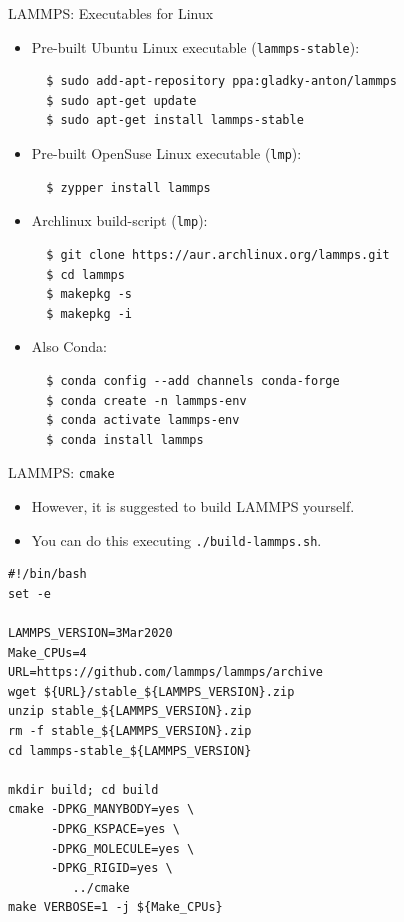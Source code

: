 \documentclass[10pt]{beamer}
\begin{document}
\begin{frame}[fragile]{LAMMPS: Executables for Linux}
  \begin{itemize}
    \item Pre-built Ubuntu Linux executable (\texttt{lammps-stable}):
    \begin{lstlisting}
  $ sudo add-apt-repository ppa:gladky-anton/lammps
  $ sudo apt-get update
  $ sudo apt-get install lammps-stable
    \end{lstlisting}

    \item Pre-built OpenSuse Linux executable (\texttt{lmp}):
    \begin{lstlisting}
  $ zypper install lammps
    \end{lstlisting}

    \item Archlinux build-script (\texttt{lmp}):
    \begin{lstlisting}
  $ git clone https://aur.archlinux.org/lammps.git
  $ cd lammps
  $ makepkg -s
  $ makepkg -i
    \end{lstlisting}

    \item Also Conda:
    \begin{lstlisting}
  $ conda config --add channels conda-forge
  $ conda create -n lammps-env
  $ conda activate lammps-env
  $ conda install lammps
    \end{lstlisting}
  \end{itemize}
\end{frame}

\begin{frame}[fragile]{LAMMPS: \texttt{cmake}}
  \begin{itemize}
    \item However, it is suggested to build LAMMPS yourself.
    \item You can do this executing \texttt{./build-lammps.sh}.
  \end{itemize}
    \begin{lstlisting}
#!/bin/bash
set -e

LAMMPS_VERSION=3Mar2020
Make_CPUs=4
URL=https://github.com/lammps/lammps/archive
wget ${URL}/stable_${LAMMPS_VERSION}.zip
unzip stable_${LAMMPS_VERSION}.zip
rm -f stable_${LAMMPS_VERSION}.zip
cd lammps-stable_${LAMMPS_VERSION}

mkdir build; cd build
cmake -DPKG_MANYBODY=yes \
      -DPKG_KSPACE=yes \
      -DPKG_MOLECULE=yes \
      -DPKG_RIGID=yes \
	     ../cmake
make VERBOSE=1 -j ${Make_CPUs}
    \end{lstlisting}
\end{frame}
\end{document}
